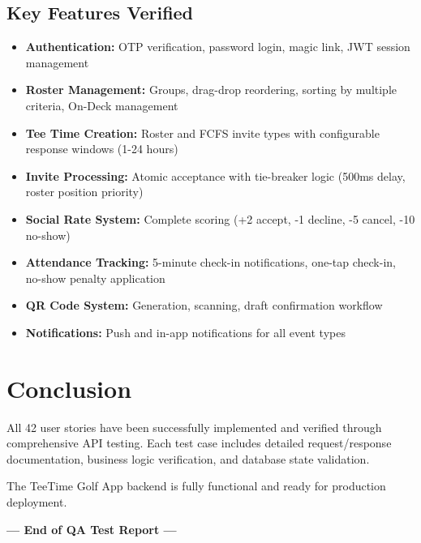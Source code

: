\documentclass[11pt,a4paper]{article}
\begin{document}
\subsection{Key Features Verified}

\begin{itemize}[leftmargin=*]
  \item \textbf{Authentication:} OTP verification, password login, magic link, JWT session management
  \item \textbf{Roster Management:} Groups, drag-drop reordering, sorting by multiple criteria, On-Deck management
  \item \textbf{Tee Time Creation:} Roster and FCFS invite types with configurable response windows (1-24 hours)
  \item \textbf{Invite Processing:} Atomic acceptance with tie-breaker logic (500ms delay, roster position priority)
  \item \textbf{Social Rate System:} Complete scoring (+2 accept, -1 decline, -5 cancel, -10 no-show)
  \item \textbf{Attendance Tracking:} 5-minute check-in notifications, one-tap check-in, no-show penalty application
  \item \textbf{QR Code System:} Generation, scanning, draft confirmation workflow
  \item \textbf{Notifications:} Push and in-app notifications for all event types
\end{itemize}

\section{Conclusion}

All 42 user stories have been successfully implemented and verified through comprehensive API testing. Each test case includes detailed request/response documentation, business logic verification, and database state validation.

The TeeTime Golf App backend is fully functional and ready for production deployment.

\vspace{1cm}

\begin{center}
\textbf{--- End of QA Test Report ---}
\end{center}
\end{document}
